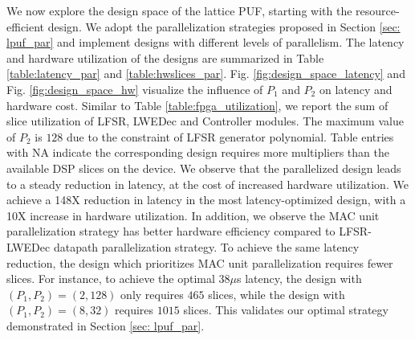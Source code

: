 We now explore the design space of the lattice PUF, starting with the resource-efficient design. We adopt the parallelization strategies proposed in Section \ref{sec: lpuf_par} and implement designs with different levels of parallelism. The latency and hardware utilization of the designs are summarized in Table \ref{table:latency_par} and \ref{table:hwslices_par}. Fig. \ref{fig:design_space_latency} and Fig. \ref{fig:design_space_hw} visualize the influence of $P_1$ and $P_2$ on latency and hardware cost. Similar to Table \ref{table:fpga_utilization}, we report the sum of slice utilization of LFSR, LWEDec and Controller modules. The maximum value of $P_2$ is $128$ due to the constraint of LFSR generator polynomial. Table entries with NA indicate the corresponding design requires more multipliers than the available DSP slices on the device. We observe that the parallelized design leads to a steady reduction in latency, at the cost of increased hardware utilization. We achieve a 148X reduction in latency in the most latency-optimized design, with a 10X increase in hardware utilization. %
In addition, we observe the MAC unit parallelization strategy has better hardware efficiency compared to LFSR-LWEDec datapath parallelization strategy. To achieve the same latency reduction, the design which prioritizes MAC unit parallelization requires fewer slices. For instance, to achieve the optimal $38 \mu$s latency, the design with $(P_1, P_2) = (2, 128)$ only requires $465$ slices, while the design with $(P_1, P_2) = (8, 32)$ requires $1015$ slices. This validates our optimal strategy demonstrated in Section \ref{sec: lpuf_par}. %

